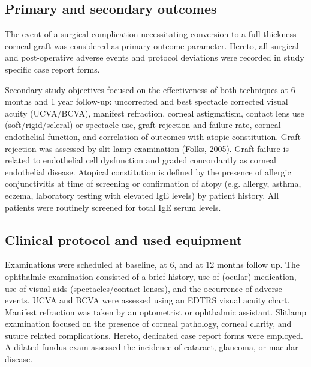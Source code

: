 \documentclass[authordate, empirical,issue]{jote-new-article}
\begin{document}
	\subsection{Primary and secondary outcomes}



	The event of a surgical complication necessitating conversion to a full-thickness corneal graft was considered as primary outcome parameter. Hereto, all surgical and post-operative adverse events and protocol deviations were recorded in study specific case report forms.



	Secondary study objectives focused on the effectiveness of both techniques at 6 months and 1 year follow-up: uncorrected and best spectacle corrected visual acuity (UCVA/BCVA), manifest refraction, corneal astigmatism, contact lens use (soft/rigid/scleral) or spectacle use, graft rejection and failure rate, corneal endothelial function, and correlation of outcomes with atopic constitution. Graft rejection was assessed by slit lamp examination (Folks, 2005). Graft failure is related to endothelial cell dysfunction and graded concordantly as corneal endothelial disease. Atopical constitution is defined by the presence of allergic conjunctivitis at time of screening or confirmation of atopy (e.g. allergy, asthma, eczema, laboratory testing with elevated IgE levels) by patient history. All patients were routinely screened for total IgE serum levels.



	\subsection{Clinical protocol and used equipment}



	Examinations were scheduled at baseline, at 6, and at 12 months follow up. The ophthalmic examination consisted of a brief history, use of (ocular) medication, use of visual aids (spectacles/contact lenses), and the occurrence of adverse events. UCVA and BCVA were assessed using an EDTRS visual acuity chart. Manifest refraction was taken by an optometrist or ophthalmic assistant. Slitlamp examination focused on the presence of corneal pathology, corneal clarity, and suture related complications. Hereto, dedicated case report forms were employed. A dilated fundus exam assessed the incidence of cataract, glaucoma, or macular disease.
\end{document}
